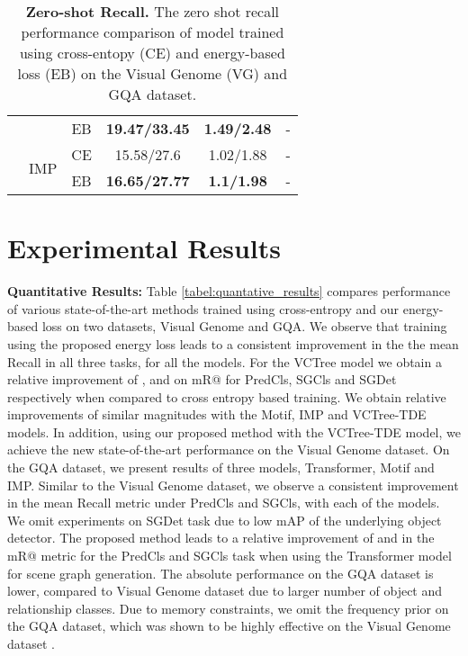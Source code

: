\documentclass[final]{cvpr}
\begin{document}
\begin{table}[t]
{\begin{tabular}{@{}cccccc@{}}
                               &                              & EB & \textbf{19.47/33.45} & \textbf{1.49/2.48} & -                  \\ \cmidrule(l){2-6} 
                               & \multirow{2}{*}{IMP}         & CE  & 15.58/27.6           & 1.02/1.88          & -                  \\
                               &                              & EB & \textbf{16.65/27.77} & \textbf{1.1/1.98}  & -                  \\ \bottomrule \bottomrule
\end{tabular}
}
\caption{\textbf{Zero-shot Recall.} The zero shot recall performance comparison of model trained using cross-entopy (CE) and energy-based loss (EB) on the Visual Genome (VG) and GQA dataset.}
\label{table:zeroshot}
\vspace{-0.1in}
\end{table}

\section{Experimental Results}

\noindent
{\bf Quantitative Results:}  
Table \ref{tabel:quantative_results} compares performance of various state-of-the-art methods trained using cross-entropy and our energy-based loss on two datasets, Visual Genome and GQA. 
We observe that training using the proposed energy loss leads to a consistent improvement in the the mean Recall in all three tasks, for all the models. For the VCTree model we obtain a relative improvement of ,  and  on mR@ for PredCls, SGCls and SGDet respectively when compared to cross entropy based training. We obtain relative improvements of similar magnitudes with the Motif, IMP and VCTree-TDE models. In addition, using our proposed method with the VCTree-TDE \cite{tang2020unbiased} model, we achieve the new state-of-the-art performance on the Visual Genome dataset. On the GQA dataset, we present results of three models, Transformer, Motif and IMP. Similar to the Visual Genome dataset, we observe a consistent improvement in the mean Recall metric under PredCls and SGCls, with each of the models. We omit experiments on SGDet task due to low mAP of the underlying object detector. The proposed method leads to a relative improvement of  and  in the mR@ metric for the PredCls and SGCls task when using the Transformer model for scene graph generation. 
The absolute performance on the GQA dataset is lower, compared to Visual Genome dataset due to larger number of object and relationship classes.
Due to memory constraints, we omit the frequency prior on the GQA dataset, which was shown to be highly effective on the Visual Genome dataset \cite{zellers2018neural}. 
\end{document}
